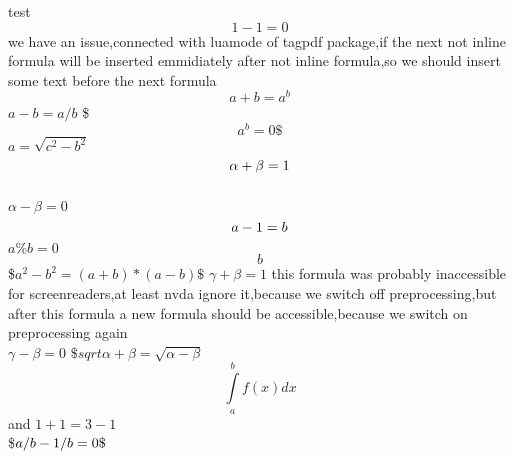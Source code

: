 \documentclass{article}
\newcommand{\test}[2]{#1+1=#2-1}
\begin{document}
test
\[1-1=0\] we have an issue,connected with luamode of tagpdf package,if the next not inline formula will be inserted emmidiately after not inline formula,so we should insert some text before the next formula 
$$a+b=a^b$$ $a-b=a/b$
\$$$a^b
=0\$$$
$
a=\sqrt{c^2-b^2}
$
\\$$\alpha+\beta=1
\\$$ \\$\alpha-\beta=0$ $$a-1=b\\$$
$a\%b= %
0$
$$b$$ %
%
\$$a^2-b^2=(a+b)*(a-b)\$$
$\gamma+\beta=1$
this formula was probably inaccessible for screenreaders,at least nvda ignore it,because we switch off preprocessing,but after this formula a new formula should be accessible,because we switch on preprocessing again
\\$\gamma-\beta=0$
$\$sqrt{\alpha+\beta}=

\sqrt{\alpha-\beta}$
$$\int\limits_a^b f(x)dx$$ and $\test{1}{3}$ \\\$$a/b-1/b=0\\\$$
\end{document}

